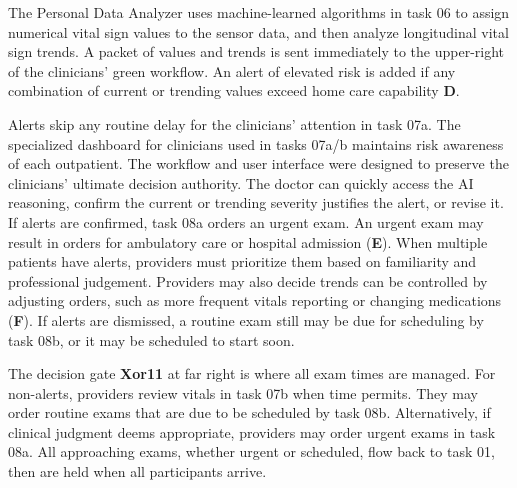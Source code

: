 The Personal Data Analyzer uses machine-learned algorithms in task 06 to assign numerical vital sign values to the sensor data, and then analyze longitudinal vital sign trends.
A packet of values and trends is sent immediately to the upper-right of the clinicians' green workflow. An alert of elevated risk is added if any combination of current or trending values exceed home care capability \textbf{D}.

Alerts skip any routine delay for the clinicians' attention in task 07a. The specialized dashboard for clinicians used in tasks 07a/b maintains risk awareness of each outpatient.
The workflow and user interface were designed to preserve the clinicians' ultimate decision authority.
The doctor can quickly access the AI reasoning, confirm the current or trending severity justifies the alert, or revise it.
If alerts are confirmed, task 08a orders an urgent exam.
An urgent exam may result in orders for ambulatory care or hospital admission (\textbf{E}).
When multiple patients have alerts, providers must prioritize them based on familiarity and professional judgement.
Providers may also decide trends can be controlled by adjusting orders, such as more frequent vitals reporting or changing medications (\textbf{F}).
If alerts are dismissed, a routine exam still may be due for scheduling by task 08b, or it may be scheduled to start soon. 

The decision gate \textbf{Xor11} at far right is where all exam times are managed.
For non-alerts, providers review vitals in task 07b when time permits. They may order routine exams that are due to be scheduled by task 08b.
Alternatively, if clinical judgment deems appropriate, providers may order urgent exams in task 08a.
All approaching exams, whether urgent or scheduled, flow back to task 01, then are held when all participants arrive.
